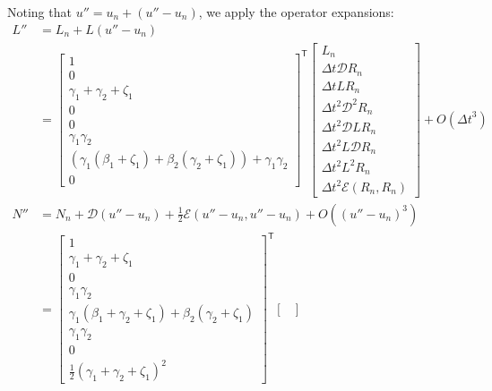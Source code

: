 \documentclass[letterpaper,11pt]{amsart}
\newcommand{\trans}[1]{{#1}^{\ensuremath{\mathsf{T}}}}
\newcommand{\order}[2]{\ensuremath{O\!\left( {#1}^{#2} \right)}}
\begin{document}
Noting that $u'' = u_{n} + \left( u'' - u_{n} \right)$,
we apply the operator expansions:
\begin{subequations}
\begin{align}
  L''
  &=
  L_{n}
  +
  L(u''-u_{n})
\\
&=
\trans{\begin{bmatrix}
  1 \\
  0 \\
  \gamma_{1} + \gamma_{2} + \zeta_{1} \\
  0 \\
  0 \\
  \gamma_{1} \gamma_{2} \\
    \left(
       \gamma_{1} \left(\beta_{1}+\zeta_{1}\right)
      +\beta_{2} \left(\gamma_{2}+\zeta_{1}\right)
    \right)
  + \gamma_{1} \gamma_{2} \\
  0
\end{bmatrix}}
\begin{bmatrix}
  L_{n} \\
  \Delta{}t \mathcal{D} R_{n} \\
  \Delta{}t L R_{n} \\
  \Delta{}t^{2} \mathcal{D}^{2} R_{n} \\
  \Delta{}t^{2} \mathcal{D} L R_{n} \\
  \Delta{}t^{2} L \mathcal{D} R_{n} \\
  \Delta{}t^{2} L^{2} R_{n} \\
  \Delta{}t^{2} \mathcal{E}\left( R_{n}, R_{n} \right)
\end{bmatrix}
  + \order{\Delta{}t}{3}
\\
  N''
  &=
  N_{n}
  + \mathcal{D} \left( u'' - u_{n} \right)
  + \frac{1}{2} \mathcal{E} \left( u''-u_{n}, u''-u_{n} \right)
  + \order{\left(u''-u_{n}\right)}{3}
\\
  &=
\trans{\begin{bmatrix}
  1 \\
  \gamma_{1} + \gamma_{2} + \zeta_{1} \\
  0 \\
  \gamma_{1} \gamma_{2} \\
    \gamma_{1} \left(\beta_{1} + \gamma_{2} + \zeta_{1}\right)
  + \beta_{2} \left(\gamma_{2} + \zeta_{1}\right) \\
  \gamma_{1} \gamma_{2} \\
  0 \\
  \frac{1}{2} \left( \gamma_{1} + \gamma_{2} + \zeta_{1} \right)^{2}
\end{bmatrix}}
\begin{bmatrix}

\end{bmatrix}
\end{align}
\end{subequations}
\end{document}
